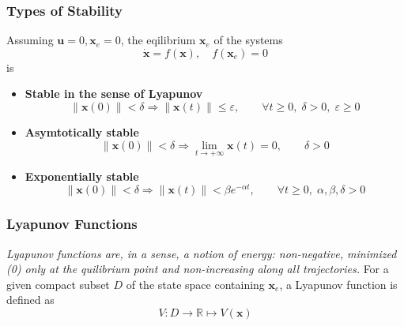 \subsubsection{Types of Stability}
Assuming $\mathbf{u}=0, \mathbf{x}_e=0$, the eqilibrium $\mathbf{x}_e$ of the systems
\noindent\begin{equation*}
    \dot{\mathbf{x}} = f(\mathbf{x}), \quad f(\mathbf{x}_e) = 0
\end{equation*}
is
\begin{itemize}
    \item \textbf{Stable in the sense of Lyapunov}
          \noindent\begin{equation*}
              \|\mathbf{x}(0)\| < \delta \Rightarrow \|\mathbf{x}(t)\| \leq \varepsilon,\qquad \forall t\geq 0,\; \delta > 0,\; \varepsilon\geq0
          \end{equation*}
    \item \textbf{Asymtotically stable}
          \noindent\begin{equation*}
              \|\mathbf{x}(0)\| < \delta \Rightarrow \lim_{t\to +\infty} \mathbf{x}(t)=0, \qquad \delta>0
          \end{equation*}
    \item \textbf{Exponentially stable}
          \noindent\begin{equation*}
              \|\mathbf{x}(0)\| < \delta \Rightarrow \|\mathbf{x}(t)\| < \beta e^{-\alpha t}, \qquad \forall t\geq 0,\; \alpha, \beta, \delta >0
          \end{equation*}
\end{itemize}

\subsubsection{Lyapunov Functions}
\textit{Lyapunov functions are, in a sense, a notion of energy: non-negative, minimized (0) only at the quilibrium point and non-increasing along all trajectories.}
\newpar{}
For a given compact subset $D$ of the state space containing $\mathbf{x}_e$, a Lyapunov function is defined as
\noindent\begin{equation*}
    V:D \to \mathbb{R} \mapsto V(\mathbf{x})
\end{equation*}

